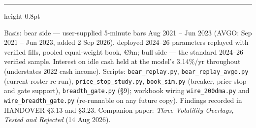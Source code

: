 \documentclass[11pt,a4paper]{article}
\begin{document}
\vspace{0.4cm}
{\color{bcnavy}\hrule height 0.8pt}
\vspace{0.2cm}
{\footnotesize\color{bcgrey} Basis: bear side --- user-supplied 5-minute bars
Aug 2021 -- Jun 2023 (AVGO: Sep 2021 -- Jun 2023, added 2 Sep 2026), deployed
2024--26 parameters replayed with verified fills, pooled equal-weight book,
€9m; bull side --- the standard 2024--26 verified sample. Interest on idle cash held at the model's 3.14\%/yr
throughout (understates 2022 cash income). Scripts:
\texttt{bear\_replay.py}, \texttt{bear\_replay\_avgo.py} (current-roster
re-run), \texttt{price\_stop\_study.py}, \texttt{book\_sim.py}
(breaker, price-stop and gate support), \texttt{breadth\_gate.py} (\S9);
workbook wiring \texttt{wire\_200dma.py} and \texttt{wire\_breadth\_gate.py}
(re-runnable on any future copy). Findings recorded in HANDOVER \S3.13 and
\S3.23. Companion paper: \emph{Three Volatility Overlays, Tested and
Rejected} (14 Aug 2026).}
\end{document}
